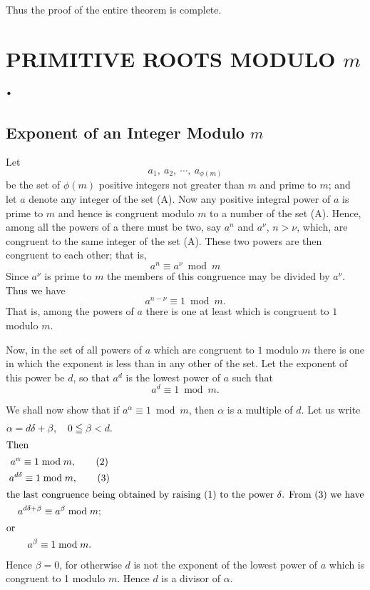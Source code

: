\documentclass[oneside]{book}
\begin{document}
Thus the proof of the entire theorem is complete.%

\chapter{PRIMITIVE ROOTS MODULO $m$.}

\section{Exponent of an Integer Modulo $m$}\label{s32}%

Let
\begin{equation*}
a_{1},\ a_{2},\ \cdots,\ a_{\phi(m)} \tag{A}
\end{equation*}
be the set of $\phi(m)$ positive integers not greater than $m$ and
prime to $m$; and let $a$ denote any integer of the set (A). Now any
positive integral power of $a$ is prime to $m$ and hence is
congruent modulo $m$ to a number of the set (A). Hence, among all
the powers of a there must be two, say $a^{n}$ and $a^{\nu}$, $n >
\nu$, which, are congruent to the same integer of the set (A). These
two powers are then congruent to each other; that is,
\begin{equation*}
a^{n} \equiv a^{\nu} \bmod m
\end{equation*}
Since $a^{\nu}$ is prime to $m$ the members of this congruence may
be divided by $a^{\nu}$. Thus we have
\begin{equation*}
a^{n - \nu} \equiv 1 \bmod m.
\end{equation*}
That is, among the powers of $a$ there is one at least which is
congruent to $1$ modulo $m$.

\smallskip Now, in the set of all powers of $a$ which are congruent
to $1$ modulo $m$ there is one in which the exponent is less than in
any other of the set. Let the exponent of this power be $d$, so that
$a^{d}$ is the lowest power of $a$ such that
\begin{equation}
a^{d} \equiv 1 \bmod m. \tag{1}
\end{equation}

We shall now show that if $a^{\alpha} \equiv 1 \bmod m$, then
$\alpha$ is a multiple of $d$. Let us write
\begin{gather}
\alpha = d\delta + \beta, \quad 0 \leqq \beta < d. \notag \\
\intertext{Then}
a^{\alpha} \equiv 1 \bmod m,   \tag{2} \\
a^{d\delta} \equiv 1 \bmod m,  \tag{3} \\
\intertext{the last congruence being obtained by raising (1) to the
power $\delta$. From (3) we have}
a^{d\delta + \beta} \equiv a^{\beta} \bmod m; \notag \\
\intertext{or}
a^{\beta}\equiv 1 \bmod m. \notag
\end{gather}
Hence $\beta = 0$, for otherwise $d$ is not the exponent of the
lowest power of $a$ which is congruent to 1 modulo $m$. Hence $d$ is
a divisor of $\alpha$.
\end{document}
